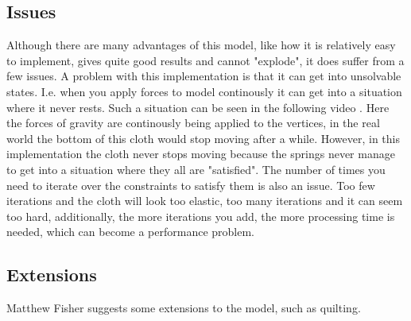 \subsection{Issues}
Although there are many advantages of this model, like how it is relatively easy to implement, gives quite good results and cannot "explode", it does suffer from a few issues.
A problem with this implementation is that it can get into unsolvable states.
I.e. when you apply forces to model continously it can get into a situation where it never rests.
Such a situation can be seen in the following video .
Here the forces of gravity are continously being applied to the vertices, in the real world the bottom
of this cloth would stop moving after a while. However, in this implementation the cloth never stops moving
because the springs never manage to get into a situation where they all are "satisfied".
The number of times you need to iterate over the constraints to satisfy them is also an issue.
Too few iterations and the cloth will look too elastic, too many iterations and it can seem too hard,
additionally, the more iterations you add, the more processing time is needed, which can become a performance problem.

\subsection{Extensions}
Matthew Fisher suggests some extensions to the model,
such as quilting.





